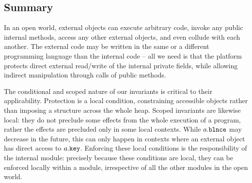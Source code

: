  
\subsection*{Summary}

In  an open world, external objects can execute arbitrary code, invoke any public internal methods, access any other external objects, and even collude with each another.
The external code may be written in the same or a different programming language than the internal code -- all we need is that the platform protects direct external read/write of  the internal private fields, while allowing indirect manipulation through calls of public methods.

 

The conditional and scoped nature of our invariants is critical to their applicability.
Protection is a local condition, constraining accessible objects rather than imposing a structure across the whole heap.
Scoped invariants are likewise local: they do not preclude some effects from the whole execution of a program,
rather the effects are precluded only in some local contexts.
While $a.\mbox{\normalfont{\texttt{\mbox{\normalfont{\texttt{blnce}}}}}}$ may decrease in the future, this can only happen in contexts where an external object has direct access to  $a.\mbox{\normalfont{\texttt{key}}}$. 
Enforcing these local conditions is the responsibility of the internal module:
precisely because these conditions are local, they can be enforced locally within a module,
irrespective of all the other modules in the open world.
 
 
 
 

